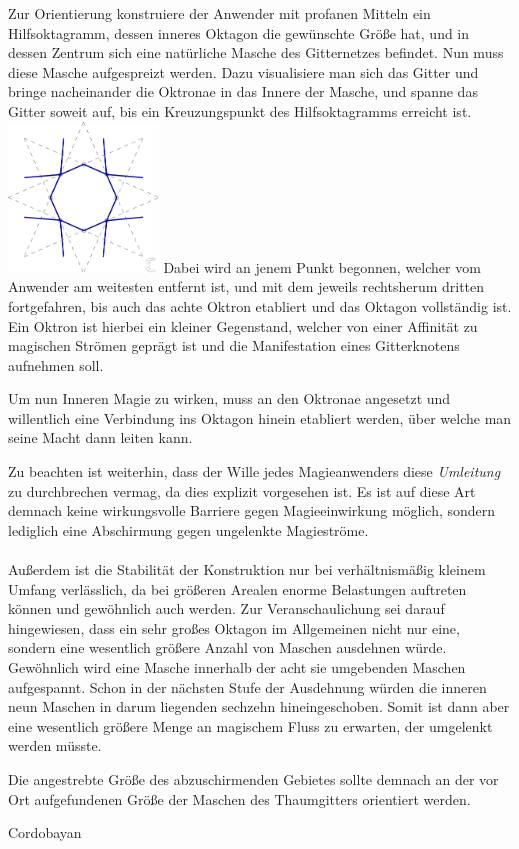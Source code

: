 \documentclass[a5paper,8pt]{book}
\begin{document}
\begin{multicols}{2}
Zur Orientierung konstruiere der Anwender mit profanen Mitteln ein Hilfsoktagramm, dessen
inneres Oktagon die gewünschte Größe hat, und in dessen Zentrum sich eine natürliche
Masche des Gitternetzes befindet. Nun muss diese Masche aufgespreizt werden. Dazu
visualisiere man sich das Gitter und bringe nacheinander die Oktronae in das Innere der
Masche, und spanne das Gitter soweit auf, bis ein Kreuzungspunkt des Hilfsoktagramms
erreicht ist.
\includegraphics[height=4cm]{pictures/Gitter_okt.png}
Dabei wird an jenem Punkt begonnen, welcher vom Anwender am weitesten entfernt ist, und
mit dem jeweils rechtsherum dritten fortgefahren, bis auch das achte Oktron etabliert und
das Oktagon vollständig ist.\\
Ein Oktron ist hierbei ein kleiner Gegenstand, welcher von einer Affinität zu magischen
Strömen geprägt ist und die Manifestation eines Gitterknotens aufnehmen soll.

Um nun Inneren Magie zu wirken, muss an den Oktronae angesetzt und willentlich eine
Verbindung ins Oktagon hinein etabliert werden, über welche man seine Macht dann leiten
kann.

Zu beachten ist weiterhin, dass der Wille jedes Magieanwenders diese \textit{Umleitung} zu
durchbrechen vermag, da dies explizit vorgesehen ist. Es ist auf diese Art demnach keine
wirkungsvolle Barriere gegen Magieeinwirkung möglich, sondern lediglich eine Abschirmung
gegen ungelenkte Magieströme.\\
\\
Außerdem ist die Stabilität der Konstruktion nur bei verhältnismäßig kleinem Umfang
verlässlich, da bei größeren Arealen enorme Belastungen auftreten können und gewöhnlich
auch werden. Zur Veranschaulichung sei darauf hingewiesen, dass ein sehr großes Oktagon
im Allgemeinen nicht nur eine, sondern eine wesentlich größere Anzahl von Maschen
ausdehnen würde. Gewöhnlich wird eine Masche innerhalb der acht sie umgebenden Maschen
aufgespannt. Schon in der nächsten Stufe der Ausdehnung würden die inneren neun Maschen
in darum liegenden sechzehn hineingeschoben. Somit ist dann aber eine wesentlich größere
Menge an magischem Fluss zu erwarten, der umgelenkt werden müsste.

Die angestrebte Größe des abzuschirmenden Gebietes sollte demnach an der vor Ort
aufgefundenen Größe der Maschen des Thaumgitters orientiert werden.

Cordobayan
\end{multicols}
\end{document}
